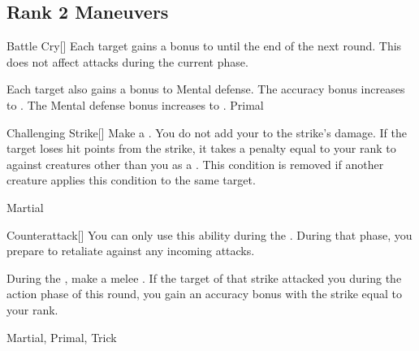 \subsection{Rank 2 Maneuvers}

\lowercase{\hypertarget{maneuver:Battle Cry}{}}\label{maneuver:Battle Cry}
\hypertarget{maneuver:Battle Cry}{}
\begin{freeability}[Rank 2]{Battle Cry}[]
Each target gains a  bonus to  until the end of the next round.
This does not affect attacks during the current phase.

\rankline
{} Each target also gains a  bonus to Mental defense.
 The accuracy bonus increases to .
 The Mental defense bonus increases to .
 Primal
\end{freeability}
\vspace{0.25em}



\lowercase{\hypertarget{maneuver:Challenging Strike}{}}\label{maneuver:Challenging Strike}
\hypertarget{maneuver:Challenging Strike}{}
\begin{freeability}[Rank 2]{Challenging Strike}[]
Make a .
You do not add your  to the strike's damage.
If the target loses hit points from the strike, it takes a penalty equal to your rank to  against creatures other than you as a .
This condition is removed if another creature applies this condition to the same target.


 Martial
\end{freeability}
\vspace{0.25em}



\lowercase{\hypertarget{maneuver:Counterattack}{}}\label{maneuver:Counterattack}
\hypertarget{maneuver:Counterattack}{}
\begin{freeability}[Rank 2]{Counterattack}[]
You can only use this ability during the .
During that phase, you prepare to retaliate against any incoming attacks.

During the , make a melee .
If the target of that strike attacked you during the action phase of this round,
you gain an accuracy bonus with the strike equal to your rank.


 Martial, Primal, Trick
\end{freeability}
\vspace{0.25em}



